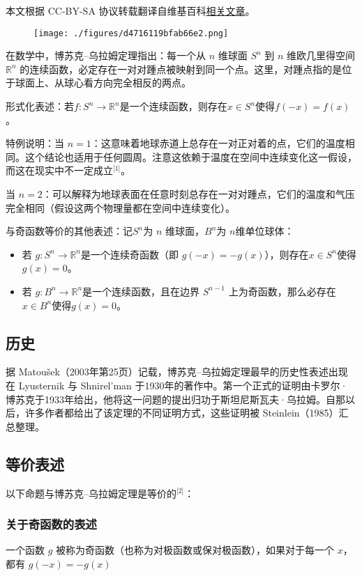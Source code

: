 
本文根据 CC-BY-SA 协议转载翻译自维基百科\href{https://en.wikipedia.org/wiki/Borsuk\%E2\%80\%93Ulam_theorem}{相关文章}。

\begin{figure}[ht]
\centering
\texttt{[image: ./figures/d4716119bfab66e2.png]}
\caption{} \label{fig_BSKwlm_2}
\end{figure}
在数学中，博苏克–乌拉姆定理指出：每一个从 $n$ 维球面 $S^n$ 到 $n$ 维欧几里得空间 $\mathbb{R}^n$ 的连续函数，必定存在一对对踵点被映射到同一个点。这里，对踵点指的是位于球面上、从球心看方向完全相反的两点。

形式化表述：若$f: S^n \to \mathbb{R}^n$是一个连续函数，则存在$x \in S^n$使得$f(-x) = f(x)$。

特例说明：当 $ n = 1$：这意味着地球赤道上总存在一对正对着的点，它们的温度相同。这个结论也适用于任何圆周。注意这依赖于温度在空间中连续变化这一假设，而这在现实中不一定成立\(^\text{[1]}\)。

当 $ n = 2 $：可以解释为地球表面在任意时刻总存在一对对踵点，它们的温度和气压完全相同（假设这两个物理量都在空间中连续变化）。

与奇函数等价的其他表述：记$ S^n $为 $n$ 维球面，$ B^n $为 $n$维单位球体：
\begin{itemize}
\item 若  $g: S^n \to \mathbb{R}^n$是一个连续奇函数（即 $g(-x) = -g(x)$），则存在$x \in S^n$使得$g(x) = 0$。
\item 若 $g: B^n \to \mathbb{R}^n$是一个连续函数，且在边界 $S^{n-1}$ 上为奇函数，那么必存在$x \in B^n$使得$g(x) = 0$。
\end{itemize}
\subsection{历史}
据 Matoušek（2003年第25页）记载，博苏克–乌拉姆定理最早的历史性表述出现在 Lyusternik 与 Shnirel'man 于1930年的著作中。第一个正式的证明由卡罗尔·博苏克于1933年给出，他将这一问题的提出归功于斯坦尼斯瓦夫·乌拉姆。自那以后，许多作者都给出了该定理的不同证明方式，这些证明被 Steinlein（1985）汇总整理。
\subsection{等价表述}
以下命题与博苏克–乌拉姆定理是等价的\(^\text{[2]}\)：
\subsubsection{关于奇函数的表述}
一个函数 $g$ 被称为奇函数（也称为对极函数或保对极函数），如果对于每一个 $x$，都有
$g(-x) = -g(x)$

